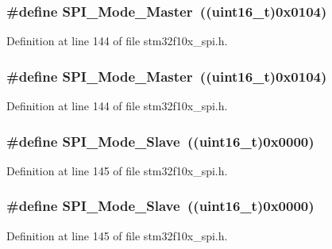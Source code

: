 \subsubsection[{\texorpdfstring{S\+P\+I\+\_\+\+Mode\+\_\+\+Master}{SPI_Mode_Master}}]{\setlength{\rightskip}{0pt plus 5cm}\#define S\+P\+I\+\_\+\+Mode\+\_\+\+Master~(({\bf uint16\+\_\+t})0x0104)}\hypertarget{group___s_p_i__mode_gaa9e47fb7c1d6c4655b72a00ed1f3b651}{}\label{group___s_p_i__mode_gaa9e47fb7c1d6c4655b72a00ed1f3b651}


Definition at line 144 of file stm32f10x\+\_\+spi.\+h.

\subsubsection[{\texorpdfstring{S\+P\+I\+\_\+\+Mode\+\_\+\+Master}{SPI_Mode_Master}}]{\setlength{\rightskip}{0pt plus 5cm}\#define S\+P\+I\+\_\+\+Mode\+\_\+\+Master~(({\bf uint16\+\_\+t})0x0104)}\hypertarget{group___s_p_i__mode_gaa9e47fb7c1d6c4655b72a00ed1f3b651}{}\label{group___s_p_i__mode_gaa9e47fb7c1d6c4655b72a00ed1f3b651}


Definition at line 144 of file stm32f10x\+\_\+spi.\+h.

\subsubsection[{\texorpdfstring{S\+P\+I\+\_\+\+Mode\+\_\+\+Slave}{SPI_Mode_Slave}}]{\setlength{\rightskip}{0pt plus 5cm}\#define S\+P\+I\+\_\+\+Mode\+\_\+\+Slave~(({\bf uint16\+\_\+t})0x0000)}\hypertarget{group___s_p_i__mode_ga84621141413ee07cb2d2dc82da2baa42}{}\label{group___s_p_i__mode_ga84621141413ee07cb2d2dc82da2baa42}


Definition at line 145 of file stm32f10x\+\_\+spi.\+h.

\subsubsection[{\texorpdfstring{S\+P\+I\+\_\+\+Mode\+\_\+\+Slave}{SPI_Mode_Slave}}]{\setlength{\rightskip}{0pt plus 5cm}\#define S\+P\+I\+\_\+\+Mode\+\_\+\+Slave~(({\bf uint16\+\_\+t})0x0000)}\hypertarget{group___s_p_i__mode_ga84621141413ee07cb2d2dc82da2baa42}{}\label{group___s_p_i__mode_ga84621141413ee07cb2d2dc82da2baa42}


Definition at line 145 of file stm32f10x\+\_\+spi.\+h.

